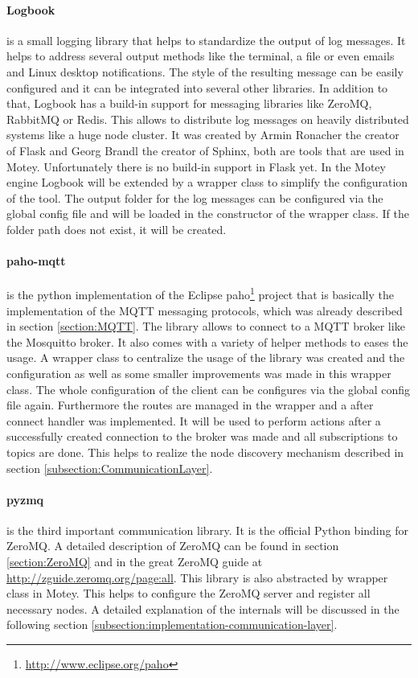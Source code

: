\paragraph{Logbook} is a small logging library that helps to standardize the output of log messages.
It helps to address several output methods like the terminal, a file or even emails and Linux desktop notifications.
The style of the resulting message can be easily configured and it can be integrated into several other libraries.
In addition to that, Logbook has a build-in support for messaging libraries like ZeroMQ, RabbitMQ or Redis.
This allows to distribute log messages on heavily distributed systems like a huge node cluster.
It was created by Armin Ronacher the creator of Flask and Georg Brandl the creator of Sphinx, both are tools that are used in Motey.
Unfortunately there is no build-in support in Flask yet.
In the Motey engine Logbook will be extended by a wrapper class to simplify the configuration of the tool.
The output folder for the log messages can be configured via the global config file and will be loaded in the constructor of the wrapper class.
If the folder path does not exist, it will be created.

\paragraph{paho-mqtt} is the python implementation of the Eclipse paho\footnote{\url{http://www.eclipse.org/paho}} project that is basically the implementation of the \ac{MQTT} messaging protocols, which was already described in section \ref{section:MQTT}.
The library allows to connect to a \ac{MQTT} broker like the Mosquitto broker.
It also comes with a variety of helper methods to eases the usage.
A wrapper class to centralize the usage of the library was created and the configuration as well as some smaller improvements was made in this wrapper class.
The whole configuration of the client can be configures via the global config file again.
Furthermore the routes are managed in the wrapper and a after connect handler was implemented.
It will be used to perform actions after a successfully created connection to the broker was made and all subscriptions to topics are done.
This helps to realize the node discovery mechanism described in section \ref{subsection:CommunicationLayer}.

\paragraph{pyzmq} is the third important communication library.
It is the official Python binding for ZeroMQ.
A detailed description of ZeroMQ can be found in section \ref{section:ZeroMQ} and in the great ZeroMQ guide at \url{http://zguide.zeromq.org/page:all}.
This library is also abstracted by wrapper class in Motey.
This helps to configure the ZeroMQ server and register all necessary nodes.
A detailed explanation of the internals will be discussed in the following section \ref{subsection:implementation-communication-layer}.

